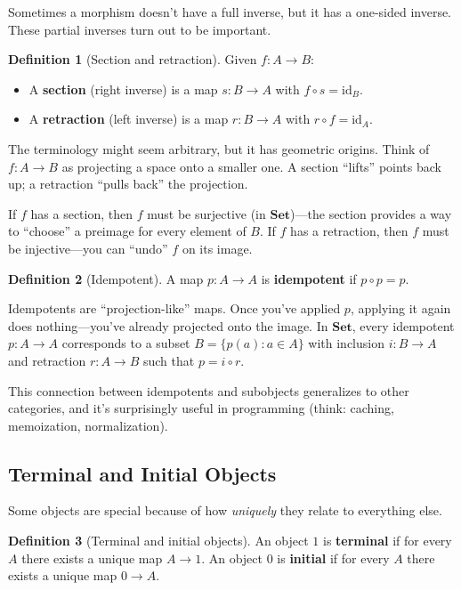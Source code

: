 \documentclass[11pt]{article}
\newcommand{\cat}[1]{\mathbf{#1}}
\newcommand{\Set}{\cat{Set}}
\newcommand{\id}{\mathrm{id}}
\theoremstyle{definition}
\newtheorem{definition}{Definition}[section]
\theoremstyle{plain}
\theoremstyle{remark}
\begin{document}
Sometimes a morphism doesn't have a full inverse, but it has a one-sided inverse. These partial inverses turn out to be important.

\begin{definition}[Section and retraction]
Given $f: A \to B$:
\begin{itemize}
  \item A \textbf{section} (right inverse) is a map $s: B \to A$ with $f \circ s = \id_B$.
  \item A \textbf{retraction} (left inverse) is a map $r: B \to A$ with $r \circ f = \id_A$.
\end{itemize}
\end{definition}

The terminology might seem arbitrary, but it has geometric origins. Think of $f: A \to B$ as projecting a space onto a smaller one. A section ``lifts'' points back up; a retraction ``pulls back'' the projection.

If $f$ has a section, then $f$ must be surjective (in $\Set$)---the section provides a way to ``choose'' a preimage for every element of $B$. If $f$ has a retraction, then $f$ must be injective---you can ``undo'' $f$ on its image.

\begin{definition}[Idempotent]
A map $p: A \to A$ is \textbf{idempotent} if $p \circ p = p$.
\end{definition}

Idempotents are ``projection-like'' maps. Once you've applied $p$, applying it again does nothing---you've already projected onto the image. In $\Set$, every idempotent $p: A \to A$ corresponds to a subset $B = \{p(a) : a \in A\}$ with inclusion $i: B \to A$ and retraction $r: A \to B$ such that $p = i \circ r$.

This connection between idempotents and subobjects generalizes to other categories, and it's surprisingly useful in programming (think: caching, memoization, normalization).

\subsection{Terminal and Initial Objects}

Some objects are special because of how \emph{uniquely} they relate to everything else.

\begin{definition}[Terminal and initial objects]
An object $1$ is \textbf{terminal} if for every $A$ there exists a unique map $A \to 1$.
An object $0$ is \textbf{initial} if for every $A$ there exists a unique map $0 \to A$.
\end{definition}
\end{document}
